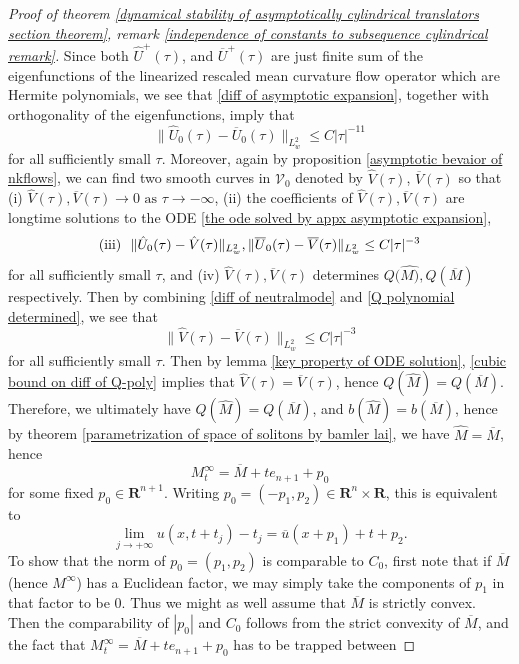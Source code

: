 \documentclass[pdflatex,sn-mathphys-num]{sn-jnl}%
\begin{document}
\begin{proof}[Proof of theorem \ref{dynamical stability of asymptotically cylindrical translators section theorem}, remark \ref{independence of constants to subsequence cylindrical remark}]
Since both $\hat{U}^+(\tau)$, and $\overline{U}^+(\tau)$ are just finite sum of the eigenfunctions of the linearized rescaled mean curvature flow operator which are Hermite polynomials, we see that \eqref{diff of asymptotic expansion}, together with orthogonality of the eigenfunctions, imply that
\begin{equation}\label{diff of neutralmode}
    \|\hat{U}_0(\tau) - \overline{U}_0(\tau)\|_{L^2_w} \leq C|\tau|^{-11}
\end{equation}
for all sufficiently small $\tau$. Moreover, again by proposition \ref{asymptotic bevaior of nkflows}, we can find two smooth curves in $\mathcal{V}_{0}$ denoted by $\hat{V}(\tau)$, $\overline{V}(\tau)$ so that (i) $\hat{V}(\tau), \overline{V}(\tau)\to 0 \text{ as }\tau \to -\infty$, (ii) the coefficients of $\hat{V}(\tau), \overline{V}(\tau)$ are longtime solutions to the ODE \eqref{the ode solved by appx asymptotic expansion},  
\begin{equation}\label{Q polynomial determined}
    \textup{(iii)}\ \ \|\hat{U}_0(\tau) - \hat{V}(\tau)\|_{L^2_{w}}, \|\overline{U}_0(\tau) - \overline{V}(\tau)\|_{L^2_w} \leq C|\tau|^{-3}
\end{equation}
for all sufficiently small $\tau$, and (iv) $\hat{V}(\tau), \overline{V}(\tau)$ determines $Q(\hat{M)}, Q(\overline{M})$ respectively. Then by combining \eqref{diff of neutralmode} and \eqref{Q polynomial determined}, we see that 
\begin{equation}\label{cubic bound on diff of Q-poly}
    \|\hat{V}(\tau) - \overline{V}(\tau)\|_{L^2_w} \leq C|\tau|^{-3}
\end{equation}
for all sufficiently small $\tau$. Then by lemma \ref{key property of ODE solution}, \eqref{cubic bound on diff of Q-poly} implies that $\hat{V}(\tau) = \overline{V}(\tau)$, hence $Q(\hat{M}) = Q(\overline{M})$. Therefore, we ultimately have $Q(\hat{M}) = Q(\overline{M})$, and $b(\hat{M}) = b(\overline{M})$, hence by theorem \ref{parametrization of space of solitons by bamler lai}, we have $\hat{M} = \overline{M}$, hence 
\begin{equation}
    M^{\infty}_t = \overline{M} + te_{n+1} + p_0
\end{equation}
for some fixed $p_0 \in \mathbf{R}^{n+1}$. Writing $p_0 = (-p_1, p_2) \in \mathbf{R}^n \times \mathbf{R}$, this is equivalent to
\begin{equation}
    \lim_{j \to +\infty}u(x, t + t_j) - t_j = \overline{u}(x + p_1) + t + p_2.
\end{equation}
To show that the norm of $p_0 = (p_1, p_2)$ is comparable to $C_0$, first note that if $\overline{M}$ (hence $M^{\infty}$) has a Euclidean factor, we may simply take the components of $p_1$ in that factor to be $0$. Thus we might as well assume that $\overline{M}$ is strictly convex. Then the comparability of $|p_0|$ and $C_0$ follows from the strict convexity of $\overline{M}$, and the fact that $M^{\infty}_t = \overline{M} + te_{n+1} + p_0$ has to be trapped between 

\end{proof}
\end{document}
